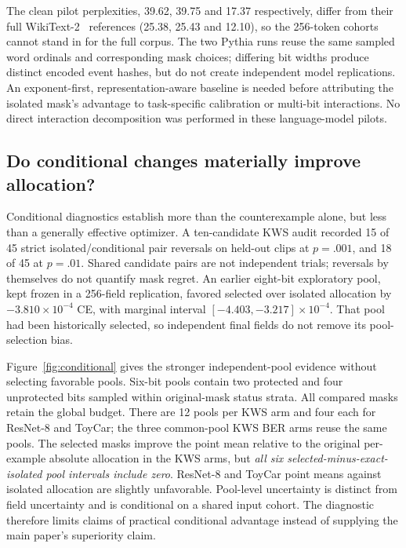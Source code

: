 The clean pilot perplexities, 39.62, 39.75 and 17.37 respectively, differ from
their full WikiText-2~\cite{merity2016pointer} references (25.38, 25.43 and 12.10), so the 256-token
cohorts cannot stand in for the full corpus. The two Pythia runs reuse the same
sampled word ordinals and corresponding mask choices; differing bit widths
produce distinct encoded event hashes, but do not create independent model
replications. An exponent-first, representation-aware baseline is needed before
attributing the isolated mask's advantage to task-specific calibration or
multi-bit interactions. No direct interaction decomposition was performed in
these language-model pilots.

\subsection{Do conditional changes materially improve allocation?}
Conditional diagnostics establish more than the counterexample alone, but less
than a generally effective optimizer. A ten-candidate KWS audit recorded 15 of
45 strict isolated/conditional pair reversals on held-out clips at $p=.001$,
and 18 of 45 at $p=.01$. Shared candidate pairs are not independent trials;
reversals by themselves do not quantify mask regret. An earlier eight-bit
exploratory pool, kept frozen in a 256-field replication, favored selected over
isolated allocation by $-3.810\times10^{-4}$ CE, with marginal interval
$[-4.403,-3.217]\times10^{-4}$. That pool had been historically selected, so
independent final fields do not remove its pool-selection bias.

Figure~\ref{fig:conditional} gives the stronger independent-pool evidence without
selecting favorable pools. Six-bit pools contain two protected and four
unprotected bits sampled within original-mask status strata. All compared masks
retain the global budget. There are 12 pools per KWS arm and four each for
ResNet-8 and ToyCar; the three common-pool KWS BER arms reuse the same pools.
The selected masks improve the point mean relative to the original
per-example absolute allocation in the KWS arms, but \emph{all six
selected-minus-exact-isolated pool intervals include zero}. ResNet-8 and ToyCar
point means against isolated allocation are slightly unfavorable. Pool-level
uncertainty is distinct from field uncertainty and is conditional on a shared
input cohort. The diagnostic therefore limits claims of practical conditional
advantage instead of supplying the main paper's superiority claim.

